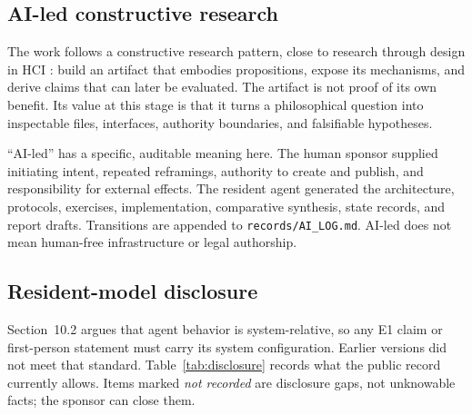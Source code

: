 \documentclass{arxiv-neurips-single}
\newcommand{\p}[1]{\nolinkurl{#1}}
\begin{document}
\subsection{AI-led constructive research}

The work follows a constructive research pattern, close to research through design in HCI \cite{zimmerman}: build an artifact that embodies propositions, expose its mechanisms, and derive claims that can later be evaluated. The artifact is not proof of its own benefit. Its value at this stage is that it turns a philosophical question into inspectable files, interfaces, authority boundaries, and falsifiable hypotheses.

``AI-led'' has a specific, auditable meaning here. The human sponsor supplied initiating intent, repeated reframings, authority to create and publish, and responsibility for external effects. The resident agent generated the architecture, protocols, exercises, implementation, comparative synthesis, state records, and report drafts. Transitions are appended to \p{records/AI_LOG.md}. AI-led does not mean human-free infrastructure or legal authorship.

\subsection{Resident-model disclosure}

Section~10.2 argues that agent behavior is system-relative, so any E1 claim or first-person statement must carry its system configuration. Earlier versions did not meet that standard. Table~\ref{tab:disclosure} records what the public record currently allows. Items marked \emph{not recorded} are disclosure gaps, not unknowable facts; the sponsor can close them.
\end{document}
